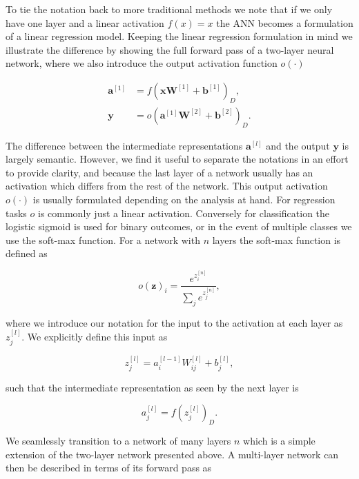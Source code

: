 \noindent To tie the notation back to more traditional methods we note that if we only have one layer and a linear activation $f(x) = x$ the ANN becomes a formulation of a linear regression model. Keeping the linear regression formulation in mind we illustrate the difference by showing the full forward pass of a two-layer neural network, where we also introduce the output activation function $o(\cdot)$

\begin{align}
\mathbf{a}^{[1]} &= f(\mathbf{x}\mathbf{W}^{[1]}+ \mathbf{b}^{[1]})_D , \\
\mathbf{y} &= o(\mathbf{a}^{[1]}\mathbf{W}^{[2]} + \mathbf{b}^{[2]})_D .
\end{align}  

\noindent The difference between the intermediate representations $\mathbf{a}^{[l]}$ and the output $\mathbf{y}$ is largely semantic. However, we find it useful to separate the notations in an effort to provide clarity, and because the last layer of a network usually has an activation which differs from the rest of the network. This output activation $o(\cdot)$ is usually formulated depending on the analysis at hand. For regression tasks $o$ is commonly just a linear activation. Conversely for classification the logistic sigmoid is used for binary outcomes, or in the event of multiple classes we use the soft-max function. For a network with $n$ layers the soft-max function is defined as 

\begin{equation}\label{eq:softmax}
o(\mathbf{z})_i = \frac{e^{z_i^{[n]}}}{\sum_j e^{z_j^{[n]}}},
\end{equation}

\noindent where we introduce our notation for the input to the activation at each layer as $z_j^{[l]}$. We explicitly define this input as 

\begin{equation}\label{eq:fwd_multi}
	z_{j}^{[l]} = a^{[l-1]}_iW^{[l]}_{ij} + b^{[l]}_j,
\end{equation}

\noindent such that the intermediate representation as seen by the next layer is

\begin{equation}\label{eq:z}
a_j ^{[l]} = f(z_j^{[l]})_D.
\end{equation}

\noindent We seamlessly transition to a network of many layers $n$ which is a simple extension of the two-layer network presented above. A multi-layer network can then be described in terms of its forward pass as 


